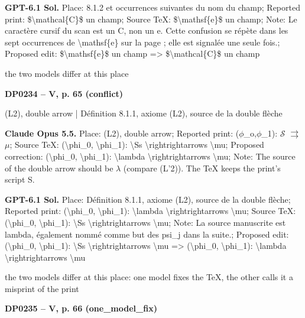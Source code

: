 \textbf{GPT-6.1 Sol.} Place: 8.1.2 et occurrences suivantes du nom du champ; Reported print: \$\textbackslash{}mathcal\{C\}\$ un champ; Source TeX: \$\textbackslash{}mathsf\{e\}\$ un champ; Note: Le caractère cursif du scan est un C, non un e. Cette confusion se répète dans les sept occurrences de \textbackslash{}mathsf\{e\} sur la page ; elle est signalée une seule fois.; Proposed edit: \$\textbackslash{}mathsf\{e\}\$ un champ =\allowbreak > \$\textbackslash{}mathcal\{C\}\$ un champ\par
the two models differ at this place\par
\par\noindent\hypertarget{DP0234}{}\textbf{DP0234 -- V, p. 65 (conflict)}\par
(L2), double arrow | Définition 8.1.1, axiome (L2), source de la double flèche\par
\textbf{Claude Opus 5.5.} Place: (L2), double arrow; Reported print: (\ensuremath{\phi}\_o,\ensuremath{\phi}\_1): \ensuremath{𝒮} \ensuremath{\rightrightarrows} \ensuremath{\mu}; Source TeX: (\textbackslash{}phi\_0, \textbackslash{}phi\_1): \textbackslash{}Ss \textbackslash{}rightrightarrows \textbackslash{}mu; Proposed correction: (\textbackslash{}phi\_0, \textbackslash{}phi\_1): \textbackslash{}lambda \textbackslash{}rightrightarrows \textbackslash{}mu; Note: The source of the double arrow should be \ensuremath{\lambda} (compare (L'2)). The TeX keeps the print's script S.\par
\textbf{GPT-6.1 Sol.} Place: Définition 8.1.1, axiome (L2), source de la double flèche; Reported print: (\textbackslash{}phi\_0, \textbackslash{}phi\_1): \textbackslash{}lambda \textbackslash{}rightrightarrows \textbackslash{}mu; Source TeX: (\textbackslash{}phi\_0, \textbackslash{}phi\_1): \textbackslash{}Ss \textbackslash{}rightrightarrows \textbackslash{}mu; Note: La source manuscrite est lambda, également nommé comme but des psi\_j dans la suite.; Proposed edit: (\textbackslash{}phi\_0, \textbackslash{}phi\_1): \textbackslash{}Ss \textbackslash{}rightrightarrows \textbackslash{}mu =\allowbreak > (\textbackslash{}phi\_0, \textbackslash{}phi\_1): \textbackslash{}lambda \textbackslash{}rightrightarrows \textbackslash{}mu\par
the two models differ at this place: one model fixes the TeX, the other calls it a misprint of the print\par
\par\noindent\hypertarget{DP0235}{}\textbf{DP0235 -- V, p. 66 (one\_model\_fix)}\par
